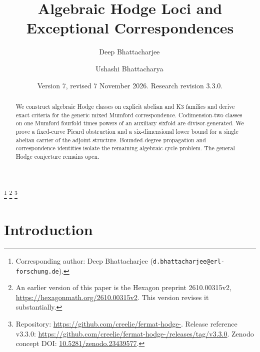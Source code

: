 \documentclass[11pt,reqno]{amsart}
\numberwithin{equation}{section}
\theoremstyle{plain}
\theoremstyle{definition}
\newcommand{\codeRelease}{https://github.com/creelie/fermat-hodge-/releases/tag/v3.3.0}
\newcommand{\archiveDOI}{10.5281/zenodo.23439577}
\newcommand{\archiveLabel}{Zenodo concept DOI}
\begin{document}

\title[Algebraic Hodge loci]{Algebraic Hodge Loci and Exceptional Correspondences}

\author{Deep Bhattacharjee\,}
\address{Formerly, Electro-Gravitational Space Propulsion Laboratory (EGSPL), Bhubaneswar, Odisha 751030, India; Formerly, University of Calcutta (Heramba Chandra College), 23/49 Gariahat Road, Golpark, Kolkata 700029, West Bengal, India}
\thanks{Corresponding author: Deep Bhattacharjee (\nolinkurl{d.bhattacharjee@erl-forschung.de}).}
\thanks{An earlier version of this paper is the Hexagon preprint 2610.00315v2, \url{https://hexagonmath.org/2610.00315v2}. This version revises it substantially.}
\thanks{Repository: \url{https://github.com/creelie/fermat-hodge-}. Release reference v3.3.0: \url{\codeRelease}. \archiveLabel: \href{https://doi.org/\archiveDOI}{\archiveDOI}.}

\author{Ushashi Bhattacharya\,}
\address{Formerly, National Taiwan University, Taipei 106319, Taiwan}

\date{Version 7, revised 7 November 2026. Research revision 3.3.0.}


\begin{abstract}
We construct algebraic Hodge classes on explicit abelian and K3 families and derive exact criteria for the generic mixed Mumford correspondence. Codimension-two classes on one Mumford fourfold times powers of an auxiliary sixfold are divisor-generated. We prove a fixed-curve Picard obstruction and a six-dimensional lower bound for a single abelian carrier of the adjoint structure. Bounded-degree propagation and correspondence identities isolate the remaining algebraic-cycle problem. The general Hodge conjecture remains open.
\end{abstract}

\maketitle
\enlargethispage{8pt}
\setcounter{tocdepth}{1}
\tableofcontents

\section{Introduction}\label{sec:intro}
\end{document}

